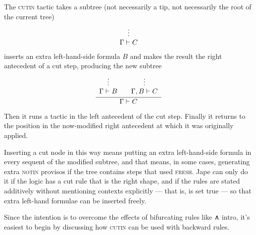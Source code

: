 The \textsc{cutin} tactic takes a subtree (not necessarily a tip, not necessarily the root of the current tree)
\begin{equation*}
\cols[c]\vdots\\\Gamma|-C\sloc
\end{equation*}
inserts an extra left-hand-side formula $B$  and makes the result the right antecedent of a cut step, producing the new subtree
\begin{equation*}
\infer{\Gamma|-C}{\cols[c]\vdots\\\Gamma|-B\sloc & \cols[c]\vdots\\\Gamma,B|-C\sloc}
\end{equation*}
Then it runs a tactic in the left antecedent of the cut step. Finally it returns to the position in the now-modified right antecedent at which it was originally applied.

Inserting a cut node in this way means putting an extra left-hand-side formula in every sequent of the modified subtree, and  that means, in some cases, generating extra \textsc{notin} provisos if the tree contains steps that used \textsc{fresh}. Jape can only do it if the logic has a cut rule that is the right shape, and if the rules are stated additively without mentioning contexts explicitly --- that is,  is set true --- so that extra left-hand formulae can be inserted freely.

Since the intention is to overcome the effects of bifurcating rules like ∧ intro, it's easiest to begin by discussing how \textsc{cutin} can be used with backward rules.

